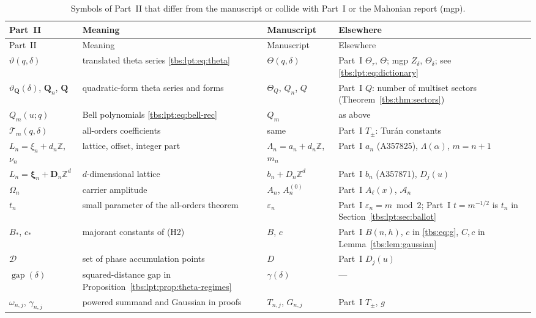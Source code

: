 \documentclass[11pt,a4paper]{article}
\numberwithin{equation}{section}
\theoremstyle{definition}
\newcommand{\Z}{\mathbb Z}
\newcommand{\Acal}{\mathcal A}
\newcommand{\eps}{\varepsilon}
\begin{document}
\begin{longtable}{@{}>{\raggedright}p{}>{\raggedright}p{}>{\raggedright}p{}p{}@{}}
\caption{Symbols of Part~II that differ from the manuscript or collide
with Part~I or the Mahonian report (mgp).}\label{tbs:lpt:tab:notation}\\
\toprule
Part~II & Meaning & Manuscript & Elsewhere\\
\midrule\endfirsthead
\toprule
Part~II & Meaning & Manuscript & Elsewhere\\
\midrule\endhead
$\vartheta(q,\delta)$ & translated theta series \eqref{tbs:lpt:eq:theta} & $\Theta(q,\delta)$ & Part~I $\Theta_\tau$, $\Theta$; mgp $Z_\delta$, $\Theta_\delta$; see \eqref{tbs:lpt:eq:dictionary}\\
$\vartheta_{\mathbf Q}(\delta)$, $\mathbf Q_n$, $\mathbf Q$ & quadratic-form theta series and forms & $\Theta_Q$, $Q_n$, $Q$ & Part~I $Q$: number of multiset sectors (Theorem~\ref{tbs:thm:sectors})\\
$Q_m(u;q)$ & Bell polynomials \eqref{tbs:lpt:eq:bell-rec} & $Q_m$ & as above\\
$\mathcal T_m(q,\delta)$ & all-orders coefficients & same & Part~I $T_\pm$: Tur\'an constants\\
$L_n=\xi_n+d_n\Z$, $\nu_n$ & lattice, offset, integer part & $\Lambda_n=a_n+d_n\Z$, $m_n$ & Part~I $a_n$ (A357825), $\Lambda(\alpha)$, $m=n+1$\\
$L_n=\boldsymbol\xi_n+\mathbf D_n\Z^d$ & $d$-dimensional lattice & $b_n+D_n\Z^d$ & Part~I $b_n$ (A357871), $D_j(u)$\\
$\Omega_n$ & carrier amplitude & $A_n$, $A_n^{(0)}$ & Part~I $A_\ell(x)$, $\Acal_n$\\
$t_n$ & small parameter of the all-orders theorem & $\eps_n$ & Part~I $\eps_n=m\bmod2$; Part~I $t=m^{-1/2}$ is $t_n$ in Section~\ref{tbs:lpt:sec:ballot}\\
$B_*$, $c_*$ & majorant constants of (H2) & $B$, $c$ & Part~I $B(n,h)$, $c$ in \eqref{tbs:eq:g}, $C,c$ in Lemma~\ref{tbs:lem:gaussian}\\
$\mathcal D$ & set of phase accumulation points & $D$ & Part~I $D_j(u)$\\
$\operatorname{gap}(\delta)$ & squared-distance gap in Proposition~\ref{tbs:lpt:prop:theta-regimes} & $\gamma(\delta)$ & ---\\
$\omega_{n,j}$, $\gamma_{n,j}$ & powered summand and Gaussian in proofs & $T_{n,j}$, $G_{n,j}$ & Part~I $T_\pm$, $g$\\

\end{longtable}
\end{document}
